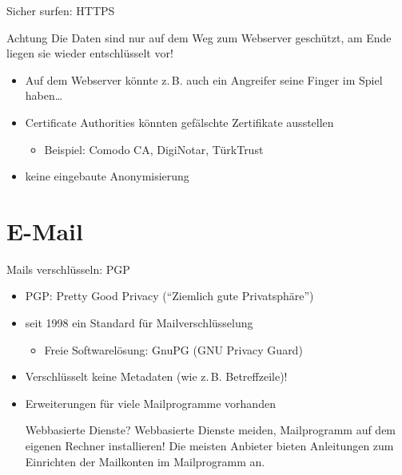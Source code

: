 \documentclass{beamer}
\begin{document}
\begin{frame}{Sicher surfen: HTTPS}
	\begin{alertblock}{Achtung}
		Die Daten sind nur auf dem Weg zum Webserver geschützt, am Ende liegen sie
		wieder entschlüsselt vor!
	\end{alertblock}

	\begin{itemize}
		\item Auf dem Webserver könnte z.\,B. auch ein Angreifer seine Finger im
			Spiel haben\ldots
		\item Certificate Authorities könnten gefälschte Zertifikate ausstellen
		\begin{itemize}
			\item Beispiel: Comodo CA, DigiNotar, TürkTrust
		\end{itemize}
		\item keine eingebaute Anonymisierung
	\end{itemize}
\end{frame}

\section{E-Mail}
\begin{frame}{Mails verschlüsseln: PGP}
\begin{itemize}
	\item PGP: Pretty Good Privacy ("`Ziemlich gute Privatsphäre"')
	\item seit 1998 ein Standard für Mailverschlüsselung
	\begin{itemize}
		\item Freie Softwarelösung: GnuPG (GNU Privacy Guard)
	\end{itemize}
	\item Verschlüsselt keine Metadaten (wie z.\,B. Betreffzeile)!
	\item Erweiterungen für viele Mailprogramme vorhanden
\begin{alertblock}{Webbasierte Dienste?}
	Webbasierte Dienste meiden, Mailprogramm auf dem eigenen Rechner installieren!
	Die meisten Anbieter bieten Anleitungen zum Einrichten der Mailkonten im
	Mailprogramm an.
\end{alertblock}
\end{itemize}
\end{frame}
\end{document}

